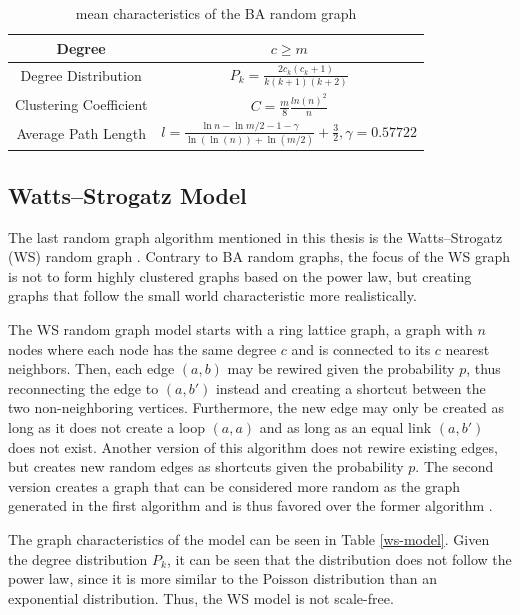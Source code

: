\begin{table}[ht!]
    \centering
    \begin{tabular}{|c | c |} 
     \hline
     Degree & $c\geq m$ \\ 
     \hline
     Degree Distribution & 
     $P_k = \frac{2c_k(c_k+1)}{k(k+1)(k+2)}$ \\ 
     \hline
     Clustering Coefficient \cite{ba_cluster_coeff} & 
     $C=\frac{m}{8}\frac{ln(n)^2}{n}$ \\ 
     \hline
     Average Path Length \cite{averagepath}& 
     $l = \frac{\ln{n}- \ln{m/2} - 1 - \gamma}{\ln(\ln(n))+\ln{(m/2)}} + \frac{3}{2}, 
     \gamma=0.57722$ \\ 
     \hline
    \end{tabular}
    \caption{mean characteristics of the BA random graph \cite{basicnetwork}}
    \label{ba-model}
\end{table}

\subsection{Watts–Strogatz Model}
The last random graph algorithm mentioned in this thesis 
is the Watts–Strogatz (WS) random graph \cite{wattsmodel}.
Contrary to BA random graphs, the focus of the WS graph is not to 
form highly clustered graphs based on the power law, but creating graphs
that follow the small world characteristic more realistically.

The WS random graph model starts with a ring lattice graph, a graph 
with $n$ nodes where each node has the same degree $c$ and 
is connected to its $c$ nearest neighbors. Then, each edge $(a, b)$
may be rewired given the probability $p$, thus reconnecting the edge to  $(a, b')$
instead and creating a shortcut between the two non-neighboring vertices.
Furthermore, the new edge may only be created as long as it does not create
a loop $(a, a)$ and as long as an equal link $(a, b')$ does not exist.
Another version of this algorithm does not rewire existing edges,
but creates new random edges as shortcuts given the probability $p$.
The second version creates a graph that can be considered more 
\glqq random\grqq{} as the graph generated in the first algorithm and is
thus favored over the former algorithm \cite{basicnetwork}.

The graph characteristics of the model can be seen
in Table \ref{ws-model}. Given the degree distribution $P_k$, it can be seen
that the distribution does not follow the power law, since it is more similar
to the Poisson distribution than an exponential distribution. Thus, the WS model
is not scale-free.

